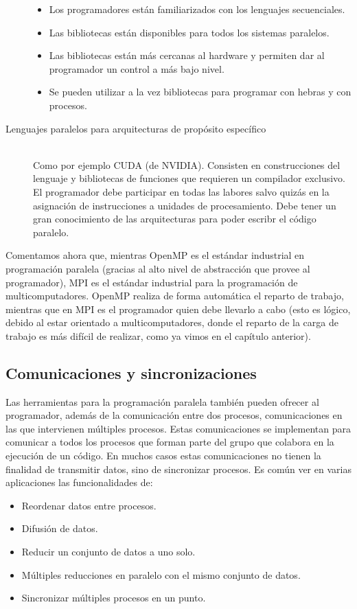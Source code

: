 \begin{description}
        \begin{itemize}
            \item Los programadores están familiarizados con los lenguajes secuenciales.
            \item Las bibliotecas están disponibles para todos los sistemas paralelos.
            \item Las bibliotecas están más cercanas al hardware y permiten dar al programador un control a más bajo nivel.
            \item Se pueden utilizar a la vez bibliotecas para programar con hebras y con procesos.
        \end{itemize}
    \item [Lenguajes paralelos para arquitecturas de propósito específico]~\\
        Como por ejemplo CUDA (de NVIDIA). Consisten en construcciones del lenguaje y bibliotecas de funciones que requieren un compilador exclusivo. El programador debe participar en todas las labores salvo quizás en la asignación de instrucciones a unidades de procesamiento. Debe tener un gran conocimiento de las arquitecturas para poder escribr el código paralelo.
\end{description}

Comentamos ahora que, mientras OpenMP es el estándar industrial en programación paralela (gracias al alto nivel de abstracción que provee al programador), MPI es el estándar industrial para la programación de multicomputadores. OpenMP realiza de forma automática el reparto de trabajo, mientras que en MPI es el programador quien debe llevarlo a cabo (esto es lógico, debido al estar orientado a multicomputadores, donde el reparto de la carga de trabajo es más difícil de realizar, como ya vimos en el capítulo anterior).

\subsection{Comunicaciones y sincronizaciones}
Las herramientas para la programación paralela también pueden ofrecer al programador, además de la comunicación entre dos procesos, comunicaciones en las que intervienen múltiples procesos. Estas comunicaciones se implementan para comunicar a todos los procesos que forman parte del grupo que colabora en la ejecución de un código. En muchos casos estas comunicaciones no tienen la finalidad de transmitir datos, sino de sincronizar procesos. Es común ver en varias aplicaciones las funcionalidades de:
\begin{itemize}
    \item Reordenar datos entre procesos.
    \item Difusión de datos.
    \item Reducir un conjunto de datos a uno solo.
    \item Múltiples reducciones en paralelo con el mismo conjunto de datos.
    \item Sincronizar múltiples procesos en un punto.
\end{itemize}

